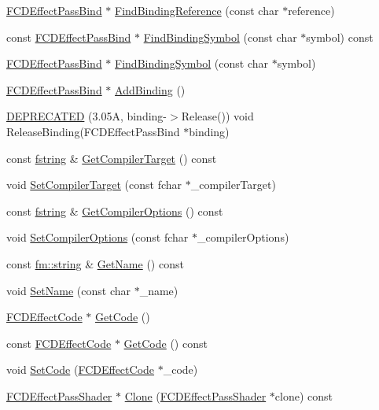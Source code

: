 \begin{DoxyCompactItemize}
\item 
\hyperlink{classFCDEffectPassBind}{FCDEffectPassBind} $\ast$ \hyperlink{classFCDEffectPassShader_a7676d499e9a4d2f85d6db549e8e2d353}{FindBindingReference} (const char $\ast$reference)
\item 
const \hyperlink{classFCDEffectPassBind}{FCDEffectPassBind} $\ast$ \hyperlink{classFCDEffectPassShader_a9271fa40c72737fcfa9e0c44a5ee2e11}{FindBindingSymbol} (const char $\ast$symbol) const 
\item 
\hyperlink{classFCDEffectPassBind}{FCDEffectPassBind} $\ast$ \hyperlink{classFCDEffectPassShader_a5e4c5b5eafffbabc2ac6cefa3351a6f5}{FindBindingSymbol} (const char $\ast$symbol)
\item 
\hyperlink{classFCDEffectPassBind}{FCDEffectPassBind} $\ast$ \hyperlink{classFCDEffectPassShader_ac99bba07d76ccb9be805d64fa7693bbd}{AddBinding} ()
\item 
\hyperlink{classFCDEffectPassShader_a447a9016612aa1f0e836d7e04dc18963}{DEPRECATED} (3.05A, binding-\/$>$Release()) void ReleaseBinding(FCDEffectPassBind $\ast$binding)
\item 
const \hyperlink{classfm_1_1stringT}{fstring} \& \hyperlink{classFCDEffectPassShader_a15899c058bde932cf352ab1f4741ac6e}{GetCompilerTarget} () const 
\item 
void \hyperlink{classFCDEffectPassShader_a54510d91cdb8a8a0acb8e8de365751e9}{SetCompilerTarget} (const fchar $\ast$\_\-compilerTarget)
\item 
const \hyperlink{classfm_1_1stringT}{fstring} \& \hyperlink{classFCDEffectPassShader_a86a7b27f70b58589dd9cd8c0366c585a}{GetCompilerOptions} () const 
\item 
void \hyperlink{classFCDEffectPassShader_af7d74246e413298b96ef3568e2dd9913}{SetCompilerOptions} (const fchar $\ast$\_\-compilerOptions)
\item 
const \hyperlink{classfm_1_1stringT}{fm::string} \& \hyperlink{classFCDEffectPassShader_ad8500b40b69fa965e7c9339848d4c7ec}{GetName} () const 
\item 
void \hyperlink{classFCDEffectPassShader_a7d907beb4ad9f6aa77ea6f2ca10366af}{SetName} (const char $\ast$\_\-name)
\item 
\hyperlink{classFCDEffectCode}{FCDEffectCode} $\ast$ \hyperlink{classFCDEffectPassShader_af2d089e27b1378d3e258a640307e89ba}{GetCode} ()
\item 
const \hyperlink{classFCDEffectCode}{FCDEffectCode} $\ast$ \hyperlink{classFCDEffectPassShader_a5531627c61332877f09641f4d508f57a}{GetCode} () const 
\item 
void \hyperlink{classFCDEffectPassShader_a0ca1befb72b2e5dec4a67bbb8b8167ea}{SetCode} (\hyperlink{classFCDEffectCode}{FCDEffectCode} $\ast$\_\-code)
\item 
\hyperlink{classFCDEffectPassShader}{FCDEffectPassShader} $\ast$ \hyperlink{classFCDEffectPassShader_a409fbe05f0be92651824f238b7a89cfd}{Clone} (\hyperlink{classFCDEffectPassShader}{FCDEffectPassShader} $\ast$clone) const 
\end{DoxyCompactItemize}



